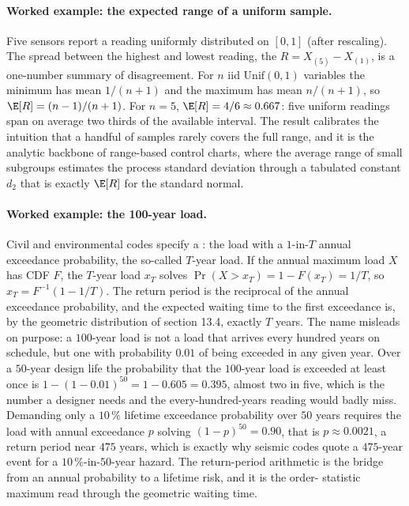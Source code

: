 \paragraph{Worked example: the expected range of a uniform sample.}
Five sensors report a reading uniformly distributed on $[0, 1]$
(after rescaling). The spread between the highest and lowest reading,
the  $R = X_{(5)} - X_{(1)}$, is a one-number
summary of disagreement. For $n$ iid $\mathrm{Unif}(0, 1)$ variables
the minimum has mean $1/(n+1)$ and the maximum has mean $n/(n+1)$, so
$\E[R] = (n-1)/(n+1)$. For $n = 5$, $\E[R] = 4/6 \approx 0.667$: five
uniform readings span on average two thirds of the available interval.
The result calibrates the intuition that a handful of samples rarely
covers the full range, and it is the analytic backbone of
range-based control charts, where the average range of small subgroups
estimates the process standard deviation through a tabulated constant
$d_{2}$ that is exactly $\E[R]$ for the standard normal.



\paragraph{Worked example: the 100-year load.} Civil and environmental
codes specify a : the load with a $1$-in-$T$
annual exceedance probability, the so-called $T$-year load. If the
annual maximum load $X$ has CDF $F$, the $T$-year load $x_{T}$ solves
$\Pr(X > x_{T}) = 1 - F(x_{T}) = 1/T$, so $x_{T} = F^{-1}(1 - 1/T)$. The
return period is the reciprocal of the annual exceedance probability,
and the expected waiting time to the first exceedance is, by the
geometric distribution of section 13.4, exactly $T$ years. The name
misleads on purpose: a $100$-year load is not a load that arrives every
hundred years on schedule, but one with probability $0.01$ of being
exceeded in any given year. Over a $50$-year design life the probability
that the $100$-year load is exceeded at least once is $1 - (1 -
0.01)^{50} = 1 - 0.605 = 0.395$, almost two in five, which is the number
a designer needs and the every-hundred-years reading would badly miss.
Demanding only a $10\,\%$ lifetime exceedance probability over $50$
years requires the load with annual exceedance $p$ solving $(1 - p)^{50}
= 0.90$, that is $p \approx 0.0021$, a return period near $475$ years,
which is exactly why seismic codes quote a $475$-year event for a
$10\,\%$-in-$50$-year hazard. The return-period arithmetic is the bridge
from an annual probability to a lifetime risk, and it is the order-
statistic maximum read through the geometric waiting time.

